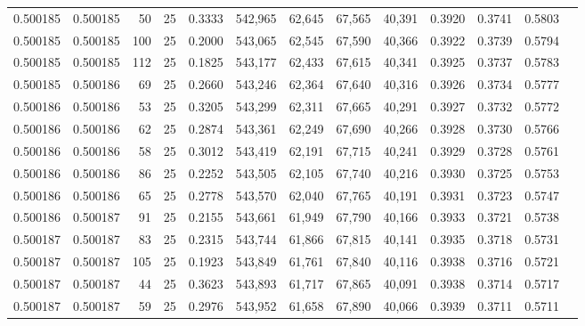\begin{tabular}{rrrrrrrrrrrrr}
0.500185 & 0.500185 &    50 &  25 &                                     0.3333 & 542,965 &  62,645 &  67,565 &  40,391 & 0.3920 & 0.3741 & 0.5803 \\
0.500185 & 0.500185 &   100 &  25 &                                     0.2000 & 543,065 &  62,545 &  67,590 &  40,366 & 0.3922 & 0.3739 & 0.5794 \\
0.500185 & 0.500185 &   112 &  25 &                                     0.1825 & 543,177 &  62,433 &  67,615 &  40,341 & 0.3925 & 0.3737 & 0.5783 \\
0.500185 & 0.500186 &    69 &  25 &                                     0.2660 & 543,246 &  62,364 &  67,640 &  40,316 & 0.3926 & 0.3734 & 0.5777 \\
0.500186 & 0.500186 &    53 &  25 &                                     0.3205 & 543,299 &  62,311 &  67,665 &  40,291 & 0.3927 & 0.3732 & 0.5772 \\
0.500186 & 0.500186 &    62 &  25 &                                     0.2874 & 543,361 &  62,249 &  67,690 &  40,266 & 0.3928 & 0.3730 & 0.5766 \\
0.500186 & 0.500186 &    58 &  25 &                                     0.3012 & 543,419 &  62,191 &  67,715 &  40,241 & 0.3929 & 0.3728 & 0.5761 \\
0.500186 & 0.500186 &    86 &  25 &                                     0.2252 & 543,505 &  62,105 &  67,740 &  40,216 & 0.3930 & 0.3725 & 0.5753 \\
0.500186 & 0.500186 &    65 &  25 &                                     0.2778 & 543,570 &  62,040 &  67,765 &  40,191 & 0.3931 & 0.3723 & 0.5747 \\
0.500186 & 0.500187 &    91 &  25 &                                     0.2155 & 543,661 &  61,949 &  67,790 &  40,166 & 0.3933 & 0.3721 & 0.5738 \\
0.500187 & 0.500187 &    83 &  25 &                                     0.2315 & 543,744 &  61,866 &  67,815 &  40,141 & 0.3935 & 0.3718 & 0.5731 \\
0.500187 & 0.500187 &   105 &  25 &                                     0.1923 & 543,849 &  61,761 &  67,840 &  40,116 & 0.3938 & 0.3716 & 0.5721 \\
0.500187 & 0.500187 &    44 &  25 &                                     0.3623 & 543,893 &  61,717 &  67,865 &  40,091 & 0.3938 & 0.3714 & 0.5717 \\
0.500187 & 0.500187 &    59 &  25 &                                     0.2976 & 543,952 &  61,658 &  67,890 &  40,066 & 0.3939 & 0.3711 & 0.5711 \\

\end{tabular}
